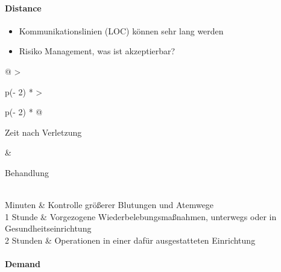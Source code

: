 {}\documentclass[a4paper]{article}
\providecommand{\tightlist}{\setlength{\itemsep}{1mm}\setlength{\parskip}{1mm}}
\begin{document}
\paragraph{Distance}\label{distance}

\begin{itemize}
	\tightlist
	\item
	      Kommunikationslinien (LOC) können sehr lang werden
	\item
	      Risiko Management, was ist akzeptierbar?
\end{itemize}

\begin{longtable}[]{@{}
	>{\raggedright\arraybackslash}p{(\columnwidth - 2\tabcolsep) * }
	>{\raggedright\arraybackslash}p{(\columnwidth - 2\tabcolsep) * }@{}}
	\toprule\noalign{}
	\begin{minipage}[b]{\linewidth}\raggedright
		Zeit nach Verletzung
	\end{minipage} & \begin{minipage}[b]{\linewidth}\raggedright
		                 Behandlung
	                 \end{minipage}                                           \\
	\midrule\noalign{}
	\endhead
	\bottomrule\noalign{}
	 Minuten                                  & Kontrolle größerer Blutungen und Atemwege               \\
	1 Stunde                                    & Vorgezogene Wiederbelebungsmaßnahmen, unterwegs oder in
	Gesundheitseinrichtung                                                                                \\
	2 Stunden                                   & Operationen in einer dafür ausgestatteten Einrichtung   \\
\end{longtable}

\paragraph{Demand}\label{demand}
\end{document}
